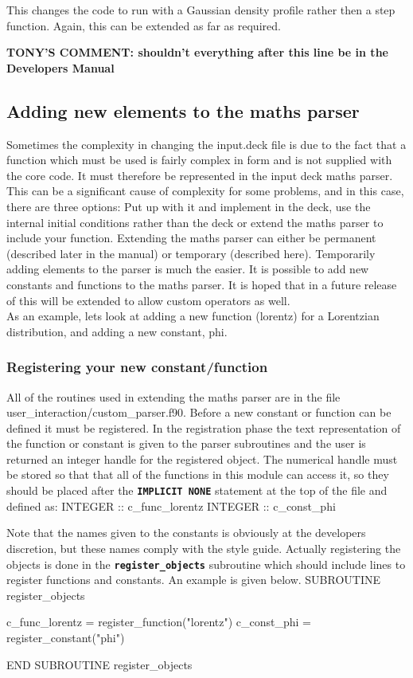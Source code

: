 \documentclass[12pt,a4paper]{article}
\newcommand{\inlinecode}[1]{{\color{warwickred} \bf\texttt{#1}}}
\newcommand{\EPOCH}{{\color{warwickdark}\fontfamily{phv}\selectfont{EPOCH}}}
\newcommand{\tony}[1]{{\color{warwickred} \bf{TONY'S COMMENT:} \bf{#1}}\\}
\newenvironment{boxverbatim}{\lboxverbatim{none}}{\endlboxverbatim}
\begin{document}
This changes the code to run with a Gaussian density profile rather then a step
function. Again, this can be extended as far as required.


\tony{shouldn't everything after this line be in the Developers Manual}
\subsection{Adding new elements to the maths parser}
Sometimes the complexity in changing the input.deck file is due to the fact that
a function which must be used is fairly complex in form and is not supplied
with the core code. It must therefore be represented in the input deck maths
parser. This can be a significant cause of complexity for some problems, and
in this case, there are three options: Put up with it and implement in the
deck, use the internal initial conditions rather than the deck or extend the
maths parser to include your function. Extending the maths parser can either
be permanent (described later in the manual) or temporary (described
here). Temporarily adding elements to the parser is much the easier. It is
possible to add new constants and functions to the maths parser. It is hoped
that in a future release of {\EPOCH} this will be extended to allow custom
operators as well.\\

As an example, lets look at adding a new function (lorentz) for a
Lorentzian distribution, and adding a new constant, phi.

\subsubsection{Registering your new constant/function}
All of the routines used in extending the maths parser are in the file
user\_interaction/custom\_parser.f90.  Before a new constant or function
can be defined it must be registered. In the registration phase the text
representation of the function or constant is given to the parser subroutines
and the user is returned an integer handle for the registered object. The
numerical handle must be stored so that that all of the functions in this
module can access it, so they should be placed after the \inlinecode{IMPLICIT
NONE} statement at the top of the file and defined as:
\begin{boxverbatim}
INTEGER :: c_func_lorentz
INTEGER :: c_const_phi
\end{boxverbatim}

Note that the names given to the constants is obviously at the developers
discretion, but these names comply with the {\EPOCH} style guide.
Actually registering the objects is done in the \inlinecode{register\_objects}
subroutine which should include lines to register functions and constants.
An example is given below.
\begin{boxverbatim}
SUBROUTINE register_objects

  c_func_lorentz = register_function("lorentz")
  c_const_phi = register_constant("phi")

END SUBROUTINE register_objects
\end{boxverbatim}
\end{document}
